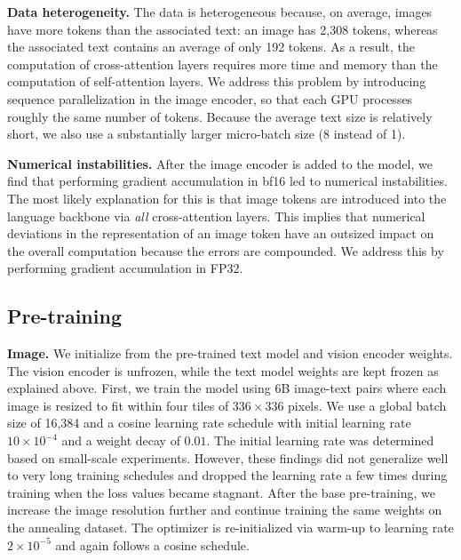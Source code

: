 \textbf{Data heterogeneity.} The data is heterogeneous because, on average, images have more tokens than the associated text: an image has 2,308 tokens, whereas the associated text contains an average of only 192 tokens. As a result, the computation of cross-attention layers requires more time and memory than the computation of self-attention layers. We address this problem by introducing sequence parallelization in the image encoder, so that each GPU processes roughly the same number of tokens. Because the average text size is relatively short, we also use a substantially larger micro-batch size (8 instead of 1).

\textbf{Numerical instabilities.} After the image encoder is added to the model, we find that performing gradient accumulation in bf16 led to numerical instabilities. The most likely explanation for this is that image tokens are introduced into the language backbone via \emph{all} cross-attention layers. This implies that numerical deviations in the representation of an image token have an outsized impact on the overall computation because the errors are compounded. We address this by performing gradient accumulation in FP32.

\subsection{Pre-training}
\label{section:vision_training_recipe}

\textbf{Image.}
We initialize from the pre-trained text model and vision encoder weights. The vision encoder is unfrozen, while the text model weights are kept frozen as explained above. First, we train the model using 6B image-text pairs where each image is resized to fit within four tiles of $336 \times 336$ pixels. We use a global batch size of 16,384 and a cosine learning rate schedule with initial learning rate $10 \times 10^{-4}$ and a weight decay of $0.01$. The initial learning rate was determined based on small-scale experiments. However,  these findings did not generalize well to very long training schedules and dropped the learning rate a few times during training when the loss values became stagnant. After the base pre-training, we increase the image resolution further and continue training the same weights on the annealing dataset. The optimizer is re-initialized via warm-up to learning rate $2 \times 10^{-5}$ and again follows a cosine schedule.

